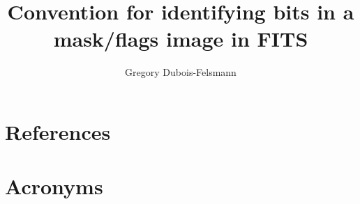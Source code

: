 \documentclass[DM,authoryear,toc]{lsstdoc}
\title{Convention for identifying bits in a mask/flags image in FITS}
\author{%
Gregory Dubois-Felsmann
}
\date{\vcsDate}
\begin{document}
\maketitle


\appendix
\section{References} \label{sec:bib}
\renewcommand{\refname}{} %


\section{Acronyms} \label{sec:acronyms}

\end{document}
